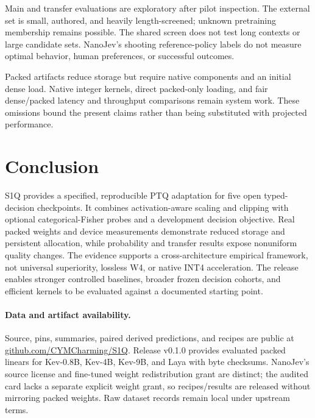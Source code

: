 \documentclass[10pt,twocolumn]{article}
\newcommand{\repo}{\href{https://github.com/CYMCharming/S1Q}{github.com/CYMCharming/S1Q}}
\begin{document}
Main and transfer evaluations are exploratory after pilot inspection.
The external set is small, authored, and heavily length-screened;
unknown pretraining membership remains possible. The shared screen
does not test long contexts or large candidate sets. NanoJev's
shooting reference-policy labels do not measure optimal behavior,
human preferences, or successful outcomes.

Packed artifacts reduce storage but require native components and
an initial dense load. Native integer kernels, direct packed-only
loading, and fair dense/packed latency and throughput comparisons
remain system work. These omissions bound the present claims
rather than being substituted with projected performance.

\section{Conclusion}
S1Q provides a specified, reproducible PTQ adaptation for five open
typed-decision checkpoints. It combines activation-aware scaling and
clipping with optional categorical-Fisher probes and a development
decision objective. Real packed weights and device measurements
demonstrate reduced storage and persistent allocation, while probability
and transfer results expose nonuniform quality changes.
The evidence supports a cross-architecture empirical framework,
not universal superiority, lossless W4, or native INT4 acceleration.
The release enables stronger controlled baselines, broader frozen
decision cohorts, and efficient kernels to be evaluated against a
documented starting point.

\paragraph{Data and artifact availability.}
Source, pins, summaries, paired derived predictions, and recipes are
public at \repo. Release v0.1.0 provides evaluated packed linears for
Kev-0.8B, Kev-4B, Kev-9B, and Laya with byte checksums.
NanoJev's source license and fine-tuned weight redistribution grant
are distinct; the audited card lacks a separate explicit weight grant,
so recipes/results are released without mirroring packed weights.
Raw dataset records remain local under upstream terms.
\end{document}
